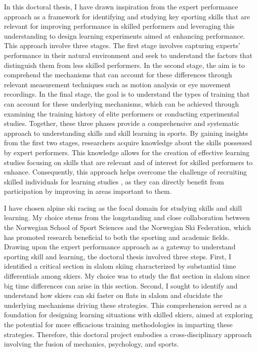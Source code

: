 In this doctoral thesis, I have drawn inspiration from the expert performance approach \cite{ericsson_development_2003, ericsson_prospects_2002, williams_using_2017, williams_perceptual-cognitive_2005} as a framework for identifying and studying key sporting skills that are relevant for improving performance in skilled performers and leveraging this understanding to design learning experiments aimed at enhancing performance. This approach involve three stages. The first stage involves capturing experts' performance in their natural environment and seek to understand the factors that distinguish them from less skilled performers.  In the second stage, the aim is to comprehend the mechanisms that can account for these differences through relevant measurement techniques such as motion analysis or eye movement recordings. In the final stage, the goal is to understand the types of training that can account for these underlying mechanisms, which can be achieved through examining the training history of elite performers or conducting experimental studies. Together, these three phases provide a comprehensive and systematic approach to understanding skills and skill learning in sports. By gaining insights from the first two stages, researchers acquire knowledge about the skills possessed by expert performers. This knowledge allows for the creation of effective learning studies focusing on skills that are relevant and of interest for skilled performers to enhance. Consequently, this approach helps overcome the challenge of recruiting skilled individuals for learning studies \cite{farrow_chapter_2017, buszard_quantifying_2017}, as they can directly benefit from participation by improving in areas important to them.

I have chosen alpine ski racing as the focal domain for studying skills and skill learning. My choice stems from the longstanding and close collaboration between the Norwegian School of Sport Sciences and the Norwegian Ski Federation, which has promoted research beneficial to both the sporting and academic fields. Drawing upon the expert performance approach as a gateway to understand sporting skill and learning, the doctoral thesis involved three steps. First, I identified a critical section in slalom skiing characterized by substantial time differentials among skiers. My choice was to study the flat section in slalom since big time differences can arise in this section. Second, I sought to identify and understand how skiers can ski faster on flats in slalom and elucidate the underlying mechanisms driving these strategies. This comprehension served as a foundation for designing learning situations with skilled skiers, aimed at exploring the potential for more efficacious training methodologies in imparting these strategies. Therefore, this doctoral project embodies a cross-disciplinary approach involving the fusion of mechanics, psychology, and sports. 

